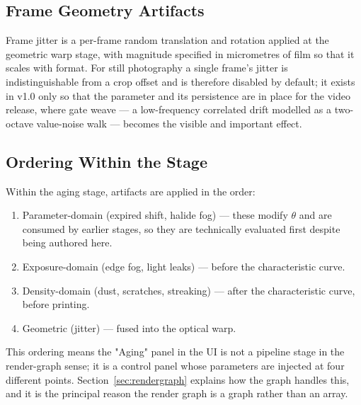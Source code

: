 \subsection{Frame Geometry Artifacts}

Frame jitter is a per-frame random translation and rotation applied at the
geometric warp stage, with magnitude specified in micrometres of film so that it
scales with format. For still photography a single frame's jitter is
indistinguishable from a crop offset and is therefore disabled by default; it
exists in v1.0 only so that the parameter and its persistence are in place for
the video release, where gate weave --- a low-frequency correlated drift modelled
as a two-octave value-noise walk --- becomes the visible and important effect.

\subsection{Ordering Within the Stage}

Within the aging stage, artifacts are applied in the order:

\begin{enumerate}
\item Parameter-domain (expired shift, halide fog) --- these modify $\theta$ and
are consumed by earlier stages, so they are technically evaluated first despite
being authored here.
\item Exposure-domain (edge fog, light leaks) --- before the characteristic
curve.
\item Density-domain (dust, scratches, streaking) --- after the characteristic
curve, before printing.
\item Geometric (jitter) --- fused into the optical warp.
\end{enumerate}

This ordering means the "Aging" panel in the UI is not a pipeline stage in the
render-graph sense; it is a control panel whose parameters are injected at four
different points. Section~\ref{sec:rendergraph} explains how the graph handles
this, and it is the principal reason the render graph is a graph rather than an
array.
